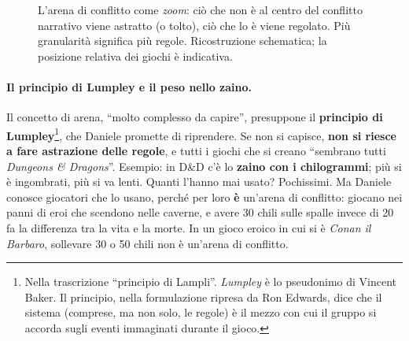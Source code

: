 \begin{figure}[htbp]
\centering
{}
\caption{L'arena di conflitto come \emph{zoom}: ciò che non è al centro del conflitto narrativo
viene astratto (o tolto), ciò che lo è viene regolato. Più granularità significa più regole.
Ricostruzione schematica; la posizione relativa dei giochi è indicativa.}
\label{a16:fig:zoom}
\end{figure}

\paragraph{Il principio di Lumpley e il peso nello zaino.} Il concetto di arena, ``molto complesso
da capire'', presuppone il \textbf{principio di Lumpley}\footnote{Nella trascrizione ``principio
di Lampli''. \emph{Lumpley} è lo pseudonimo di Vincent Baker. Il principio, nella formulazione
ripresa da Ron Edwards, dice che il sistema (comprese, ma non solo, le regole) è il mezzo con cui
il gruppo si accorda sugli eventi immaginati durante il gioco.}, che Daniele promette di
riprendere. Se non si capisce, \textbf{non si riesce a fare astrazione delle regole}, e tutti i
giochi che si creano ``sembrano tutti \emph{Dungeons \& Dragons}''. Esempio: in D\&D c'è lo
\textbf{zaino con i chilogrammi}; più si è ingombrati, più si va lenti. Quanti l'hanno mai usato?
Pochissimi. Ma Daniele conosce giocatori che lo usano, perché per loro \textbf{è} un'arena di
conflitto: giocano nei panni di eroi che scendono nelle caverne, e avere 30 chili sulle spalle
invece di 20 fa la differenza tra la vita e la morte. In un gioco eroico in cui si è \emph{Conan
il Barbaro}, sollevare 30 o 50 chili non è un'arena di conflitto.

